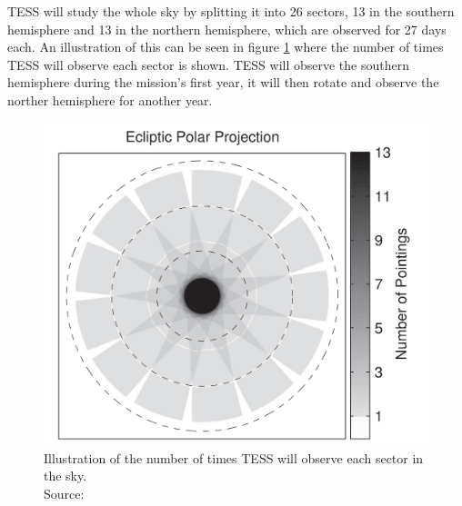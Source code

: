 \documentclass[12pt]{report}
\begin{document}
	TESS will study the whole sky by splitting it into 26 sectors, 13 in the southern hemisphere and 13 in the northern hemisphere, which are observed for 27 days each. An illustration of this can be seen in figure \ref{fig:tess_time} where the number of times TESS will observe each sector is shown. TESS will observe the southern hemisphere during the mission's first year, it will then rotate and observe the norther hemisphere for another year.
	\begin{figure}[h!]
	\centering
		\includegraphics[width=\textwidth]{img/tess_observe_time.png}
		\caption{Illustration of the number of times TESS will observe each sector in the sky.\\ \small{Source: \cite{2015ApJ...809...77S}}}
		\label{fig:tess_time}
	\end{figure}
	
	
\end{document}
